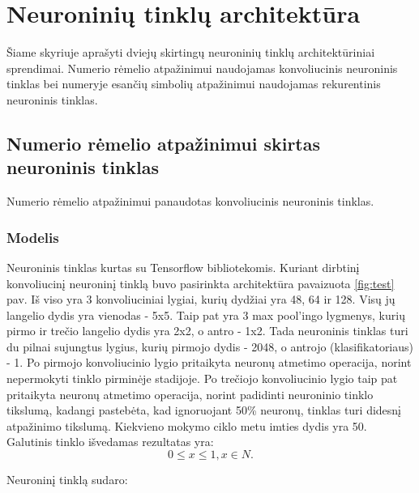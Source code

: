 \documentclass{VUMIFInfBakalaurinis}
\begin{document}
\pagebreak
\section{Neuroninių tinklų architektūra}
Šiame skyriuje aprašyti dviejų skirtingų neuroninių tinklų architektūriniai sprendimai.
Numerio rėmelio atpažinimui naudojamas konvoliucinis neuroninis tinklas bei 
numeryje esančių simbolių atpažinimui naudojamas rekurentinis neuroninis tinklas.

\subsection{Numerio rėmelio atpažinimui skirtas neuroninis tinklas}
Numerio rėmelio atpažinimui panaudotas konvoliucinis neuroninis tinklas.

\subsubsection{Modelis}
Neuroninis tinklas kurtas su Tensorflow bibliotekomis.
Kuriant dirbtinį konvoliucinį neuroninį tinklą buvo pasirinkta architektūra pavaizuota \ref{fig:test} pav.
Iš viso yra 3 konvoliuciniai lygiai, kurių dydžiai yra 48, 64 ir 128\cite{goodfellow2013multi}.
Visų jų langelio dydis yra vienodas - 5x5.
Taip pat yra 3 max pool'ingo lygmenys, kurių pirmo ir trečio langelio dydis yra 2x2, o antro - 1x2.
Tada neuroninis tinklas turi du pilnai sujungtus lygius, kurių pirmojo dydis - 2048, o antrojo (klasifikatoriaus) - 1.
Po pirmojo konvoliucinio lygio pritaikyta neuronų atmetimo operacija, norint nepermokyti tinklo pirminėje stadijoje.
Po trečiojo konvoliucinio lygio taip pat pritaikyta neuronų atmetimo operacija, norint padidinti neuroninio tinklo tikslumą, 
kadangi pastebėta, kad ignoruojant 50\% neuronų, tinklas turi didesnį atpažinimo tikslumą\cite{stark2015captcha}.
Kiekvieno mokymo ciklo metu imties dydis yra 50. Galutinis tinklo išvedamas rezultatas yra:
\begin{equation}
  0 \leq x \leq 1, x \in N.
\end{equation}

Neuroninį tinklą sudaro:
\end{document}
